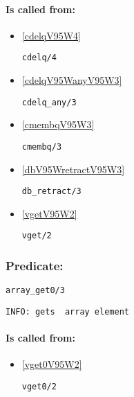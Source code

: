 \paragraph{Is called from:} 
\begin{itemize}
\item \ref{cdelqV95W4} 
\begin{verbatim}
cdelq/4
\end{verbatim}

\item \ref{cdelqV95WanyV95W3} 
\begin{verbatim}
cdelq_any/3
\end{verbatim}

\item \ref{cmembqV95W3} 
\begin{verbatim}
cmembq/3
\end{verbatim}

\item \ref{dbV95WretractV95W3} 
\begin{verbatim}
db_retract/3
\end{verbatim}

\item \ref{vgetV95W2} 
\begin{verbatim}
vget/2
\end{verbatim}

\end{itemize}

\subsubsection{Predicate:} \label{arrayV95Wget0V95W3}

\begin{verbatim}
array_get0/3
\end{verbatim}

{\small \begin{verbatim}
INFO: gets  array element

\end{verbatim}}
\paragraph{Is called from:} 
\begin{itemize}
\item \ref{vget0V95W2} 
\begin{verbatim}
vget0/2
\end{verbatim}

\end{itemize}

